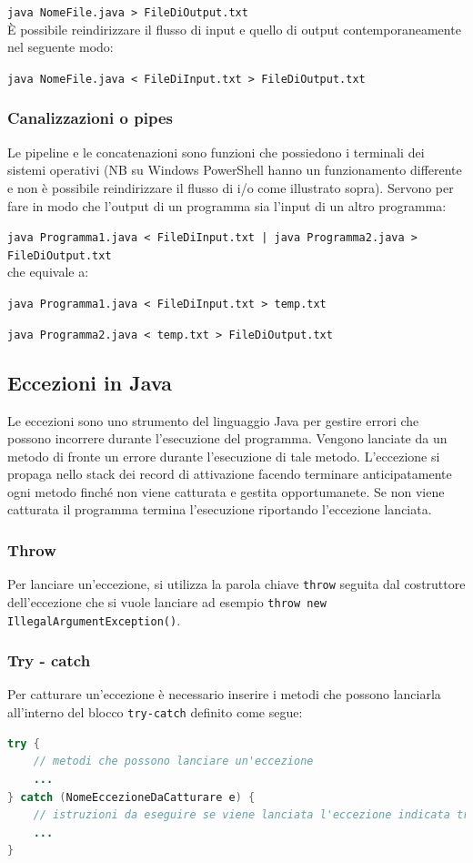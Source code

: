 \documentclass{article}
\begin{document}
\verb|java NomeFile.java > FileDiOutput.txt|
\\
È possibile reindirizzare il flusso di input e quello di output contemporaneamente nel seguente modo:

\verb|java NomeFile.java < FileDiInput.txt > FileDiOutput.txt|


\subsubsection*{Canalizzazioni o pipes}
Le pipeline e le concatenazioni sono funzioni che possiedono i terminali dei sistemi operativi (NB su Windows PowerShell hanno un funzionamento
differente e non è possibile reindirizzare il flusso di i/o come illustrato sopra). Servono per fare in modo che l'output di un programma sia 
l'input di un altro programma:

\verb=java Programma1.java < FileDiInput.txt | java Programma2.java > FileDiOutput.txt=
\\
che equivale a:

\verb|java Programma1.java < FileDiInput.txt > temp.txt|

\verb|java Programma2.java < temp.txt > FileDiOutput.txt|

\newpage


\subsection{Eccezioni in Java}
Le eccezioni sono uno strumento del linguaggio Java per gestire errori che possono incorrere durante l'esecuzione del programma.
Vengono lanciate da un metodo di fronte un errore durante l'esecuzione di tale metodo. L'eccezione si propaga nello stack dei record
di attivazione facendo terminare anticipatamente ogni metodo finché non viene catturata e gestita opportumanete.
Se non viene catturata il programma termina l'esecuzione riportando l'eccezione lanciata.

\subsubsection*{Throw}
Per lanciare un'eccezione, si utilizza la parola chiave \verb|throw| seguita dal costruttore dell'eccezione che si vuole lanciare
ad esempio \verb|throw new IllegalArgumentException()|.

\subsubsection*{Try - catch}
Per catturare un'eccezione è necessario inserire i metodi che possono lanciarla all'interno del blocco \verb|try-catch|
definito come segue:
\begin{lstlisting}[language=Java]
try {
	// metodi che possono lanciare un'eccezione
	...
} catch (NomeEccezioneDaCatturare e) {
	// istruzioni da eseguire se viene lanciata l'eccezione indicata tra parentesi
	...
}
\end{lstlisting}
\end{document}
